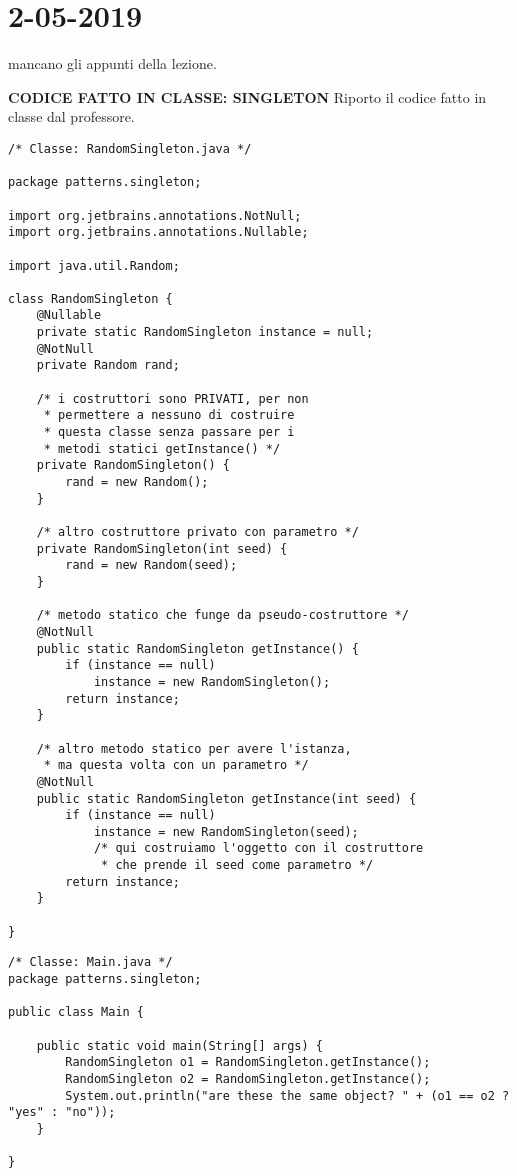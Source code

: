 

\newpage
\section{2-05-2019}
\noindent mancano gli appunti della lezione.


\noindent \textbf{CODICE FATTO IN CLASSE: SINGLETON} \newline
Riporto il codice fatto in classe dal professore. \newline

\begin{lstlisting}
/* Classe: RandomSingleton.java */

package patterns.singleton;

import org.jetbrains.annotations.NotNull;
import org.jetbrains.annotations.Nullable;

import java.util.Random;

class RandomSingleton {
    @Nullable
    private static RandomSingleton instance = null;
    @NotNull
    private Random rand;

    /* i costruttori sono PRIVATI, per non
     * permettere a nessuno di costruire
     * questa classe senza passare per i 
     * metodi statici getInstance() */
    private RandomSingleton() {
        rand = new Random();
    }

    /* altro costruttore privato con parametro */
    private RandomSingleton(int seed) {
        rand = new Random(seed);
    }

    /* metodo statico che funge da pseudo-costruttore */
    @NotNull
    public static RandomSingleton getInstance() {
        if (instance == null)
            instance = new RandomSingleton();
        return instance;
    }

    /* altro metodo statico per avere l'istanza, 
     * ma questa volta con un parametro */
    @NotNull
    public static RandomSingleton getInstance(int seed) {
        if (instance == null)
            instance = new RandomSingleton(seed);   
            /* qui costruiamo l'oggetto con il costruttore
             * che prende il seed come parametro */
        return instance;
    }

}
\end{lstlisting}


\begin{lstlisting}
/* Classe: Main.java */
package patterns.singleton;

public class Main {

    public static void main(String[] args) {
        RandomSingleton o1 = RandomSingleton.getInstance();
        RandomSingleton o2 = RandomSingleton.getInstance();
        System.out.println("are these the same object? " + (o1 == o2 ? "yes" : "no"));
    }

}
\end{lstlisting}

